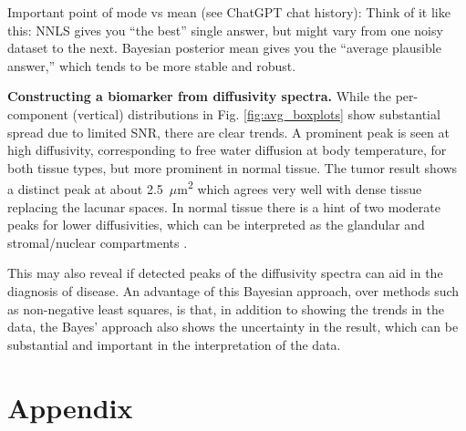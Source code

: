 \documentclass{article}
\begin{document}
Important point of mode vs mean (see ChatGPT chat history):
Think of it like this:
NNLS gives you “the best” single answer, but might vary from one noisy dataset to the next.
Bayesian posterior mean gives you the “average plausible answer,” which tends to be more stable and robust.


\textbf{Constructing a biomarker from diffusivity spectra.} While the per-component (vertical) distributions in Fig. \ref{fig:avg_boxplots} show substantial spread due to limited SNR, there are clear trends. A prominent peak is seen at high diffusivity, corresponding to free water diffusion at body temperature, for both tissue types, but more prominent in normal tissue. The tumor result shows a distinct peak at about 2.5~\(\mu\)m\textsuperscript{2} which agrees very well with dense tissue replacing the lacunar spaces. In normal tissue there is a hint of two moderate peaks for lower diffusivities, which can be interpreted as the glandular and stromal/nuclear compartments \cite{bourne2012microscopic}. 

This may also reveal if detected peaks of the diffusivity spectra can aid in the diagnosis of disease. An advantage of this Bayesian approach, over methods such as non-negative least squares, is that, in addition to showing the trends in the data, the Bayes' approach also shows the uncertainty in the result, which can be substantial and important in the interpretation of the data.

\section{Appendix}



\end{document}
